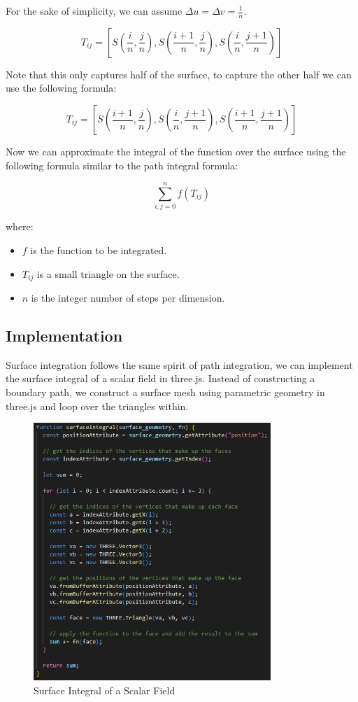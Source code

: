 \documentclass[12pt]{article}
\begin{document}
For the sake of simplicity, we can assume \(\Delta u = \Delta v = \frac{1}{n}\).

\[
    T_{ij} = \left[S\left(\frac{i}{n}, \frac{j}{n}\right), S\left(\frac{i + 1}{n}, \frac{j}{n}\right), S\left(\frac{i}{n}, \frac{j + 1}{n}\right)\right]
\]

Note that this only captures half of the surface, to capture the other half we can use the following formula:

\[
    T_{ij} = \left[S\left(\frac{i + 1}{n}, \frac{j}{n}\right), S\left(\frac{i}{n}, \frac{j + 1}{n}\right), S\left(\frac{i + 1}{n}, \frac{j + 1}{n}\right)\right]
\]

Now we can approximate the integral of the function over the surface using the following formula similar to the path integral formula:

\[
    \sum_{i, j=0}^{n} f(T_{ij})
\]

where:

\begin{itemize}
    \item \(f\) is the function to be integrated.
    \item \(T_{ij}\) is a small triangle on the surface.
    \item \(n\) is the integer number of steps per dimension.
\end{itemize}

\subsection{Implementation}

Surface integration follows the same spirit of path integration, we can implement the surface integral of a scalar field in three.js\cite{El-Deeb_PEU-218_Stokes_Threejs}.
Instead of constructing a boundary path, we construct a surface mesh using parametric geometry in three.js and loop over the triangles within.

\begin{figure}[H]
    \centering
    \includegraphics[width=0.8\textwidth]{images/surface_int.png}
    \caption{Surface Integral of a Scalar Field\cite{El-Deeb_PEU-218_Stokes_Threejs}}
\end{figure}
\end{document}
